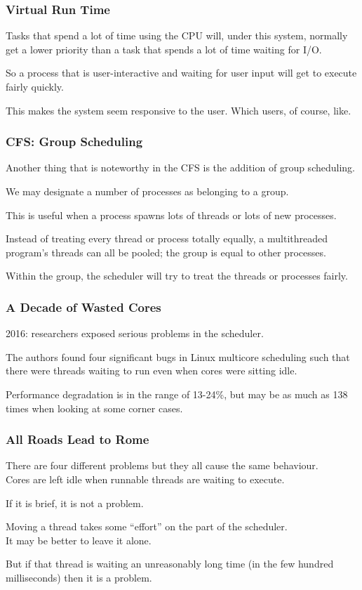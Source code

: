 \begin{frame}
\frametitle{Virtual Run Time}

Tasks that spend a lot of time using the CPU will, under this system, normally get a lower priority than a task that spends a lot of time waiting for I/O.

So a process that is user-interactive and waiting for user input will get to execute fairly quickly.

This makes the system seem responsive to the user. Which users, of course, like.

\end{frame}

\begin{frame}
\frametitle{CFS: Group Scheduling}

Another thing that is noteworthy in the CFS is the addition of group scheduling. 

We may designate a number of processes as belonging to a group. 

This is useful when a process spawns lots of threads or lots of new processes. 

Instead of treating every thread or process totally equally, a multithreaded program's threads can all be pooled; the group is equal to other processes. 

Within the group, the scheduler will try to treat the threads or processes fairly.

\end{frame}




\begin{frame}
\frametitle{A Decade of Wasted Cores}

2016: researchers exposed serious problems in the scheduler. 

The authors found four significant bugs in Linux multicore scheduling such that there were threads waiting to run even when cores were sitting idle. 

Performance degradation is in the range of 13-24\%, but may be as much as 138 times when looking at some corner cases. 

\end{frame}



\begin{frame}
\frametitle{All Roads Lead to Rome}

There are four different problems but they all cause the same behaviour. \\
\quad Cores are left idle when runnable threads are waiting to execute. 

If it is brief, it is not a problem.

Moving a thread takes some ``effort'' on the part of the scheduler.\\
\quad It may be better to leave it alone. 

But if that thread is waiting an unreasonably long time (in the few hundred milliseconds) then it is a problem.

\end{frame}



